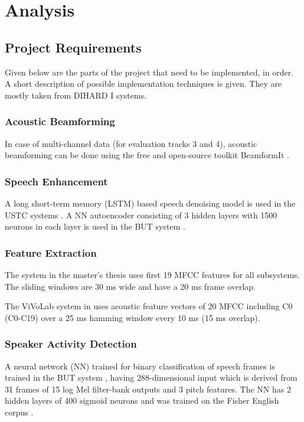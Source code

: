 \chapter{Analysis}

\section{Project Requirements}
Given below are the parts of the project that need to be implemented, in order. A short description of possible implementation techniques is given. They are mostly taken from DIHARD I systems.

	\subsection{Acoustic Beamforming}
	In case of multi-channel data (for evaluation tracks 3 and 4), acoustic beamforming \cite{anguera2007acoustic} can be done using the free and open-source toolkit BeamformIt \cite{anguera2006beamformit}.

	\subsection{Speech Enhancement}
	A long short-term memory (LSTM) based speech denoising model is used in the USTC systems \cite{sun2018speaker,sunustc}. A NN autoencoder consisting of 3 hidden layers with 1500 neurons in each layer is used in the BUT system \cite{inproceedings}.
	
	\subsection{Feature Extraction}
	The system in the master's thesis \cite{parthe-thesis} uses first 19 MFCC features for all subsystems. The sliding windows are 30 ms wide and have a 20 ms frame overlap.
	
	The ViVoLab system in \cite{Vials2018DIHARD2I} uses acoustic feature vectors of 20 MFCC including C0 (C0-C19) over a 25 ms hamming window every 10 ms (15 ms overlap).
		
	\subsection{Speaker Activity Detection}
	A neural network (NN) trained for binary classification of speech frames is trained in the BUT system \cite{inproceedings}, having 288-dimensional input which is derived from 31 frames of 15 log Mel filter-bank outputs and 3 pitch features. The NN has 2 hidden layers of 400 sigmoid neurons and was trained on the Fisher English corpus \cite{cieri2004fisher}.
	
